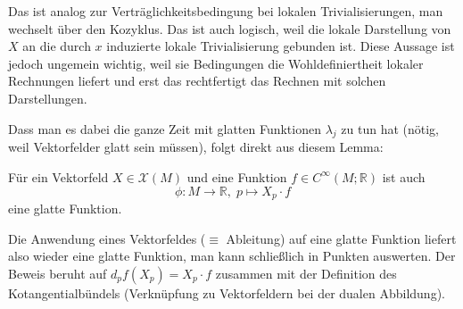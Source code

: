 \documentclass[../H_Analysis_main.tex]{subfiles}
\begin{document}
Das ist analog zur Verträglichkeitsbedingung bei lokalen Trivialisierungen, man wechselt über den Kozyklus. Das ist auch logisch, weil die lokale Darstellung von $X$ an die durch $x$ induzierte lokale Trivialisierung gebunden ist. Diese Aussage ist jedoch ungemein wichtig, weil sie Bedingungen die Wohldefiniertheit lokaler Rechnungen liefert und erst das rechtfertigt das Rechnen mit solchen Darstellungen.

Dass man es dabei die ganze Zeit mit glatten Funktionen $\lambda_j$ zu tun hat (nötig, weil Vektorfelder glatt sein müssen), folgt direkt aus diesem Lemma:
\begin{lemma}\label{lemma:vektfeldfkt}
Für ein Vektorfeld $X \in \mathcal{X}(M)$ und eine Funktion $f \in C^\infty(M; \mathbb{R})$ ist auch
\begin{equation}
\phi: M \rightarrow \mathbb{R}, \;  p \mapsto X_p \cdot f
\end{equation}
eine glatte Funktion.
\end{lemma}
Die Anwendung eines Vektorfeldes ($\equiv$ Ableitung) auf eine glatte Funktion liefert also wieder eine glatte Funktion, man kann schließlich in Punkten auswerten. Der Beweis beruht auf $d_p f(X_p) = X_p \cdot f$ zusammen mit der Definition des Kotangentialbündels (Verknüpfung zu Vektorfeldern bei der dualen Abbildung).

\end{document}
